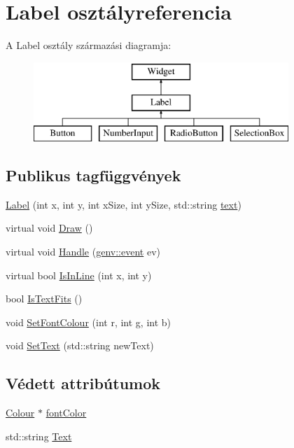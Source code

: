 \hypertarget{class_label}{}\section{Label osztályreferencia}
\label{class_label}
A Label osztály származási diagramja\+:\begin{figure}[H]
\begin{center}
\leavevmode
\includegraphics[height=3.000000cm]{class_label}
\end{center}
\end{figure}
\subsection*{Publikus tagfüggvények}
\begin{DoxyCompactItemize}
\item 
\hyperlink{class_label_a4fcabadbd0cfb0a53b8d1caf306bd5a7}{Label} (int x, int y, int x\+Size, int y\+Size, std\+::string \hyperlink{structgenv_1_1text}{text})
\item 
virtual void \hyperlink{class_label_a184df028b3aa8c7f8dec8ecb90533319}{Draw} ()
\item 
virtual void \hyperlink{class_label_a5cf04da7def075453b5c0fda93a1b575}{Handle} (\hyperlink{structgenv_1_1event}{genv\+::event} ev)
\item 
virtual bool \hyperlink{class_label_a918ebb45dbaa5484643355cf5ab4be47}{Is\+In\+Line} (int x, int y)
\item 
bool \hyperlink{class_label_a0dcc047c736b8c20bcba6796e85f909e}{Is\+Text\+Fits} ()
\item 
void \hyperlink{class_label_ac22c98a976f1fb6f4b86ee9ac8dd50b2}{Set\+Font\+Colour} (int r, int g, int b)
\item 
void \hyperlink{class_label_a4dcd2036ce1fdd30eb3471e2c842e97d}{Set\+Text} (std\+::string new\+Text)
\end{DoxyCompactItemize}
\subsection*{Védett attribútumok}
\begin{DoxyCompactItemize}
\item 
\hyperlink{class_colour}{Colour} $\ast$ \hyperlink{class_label_a72057af57385e0e88577cae1ae35af66}{font\+Color}
\item 
std\+::string \hyperlink{class_label_a74410e9b43ea90d40c828008e5904f95}{Text}
\end{DoxyCompactItemize}


